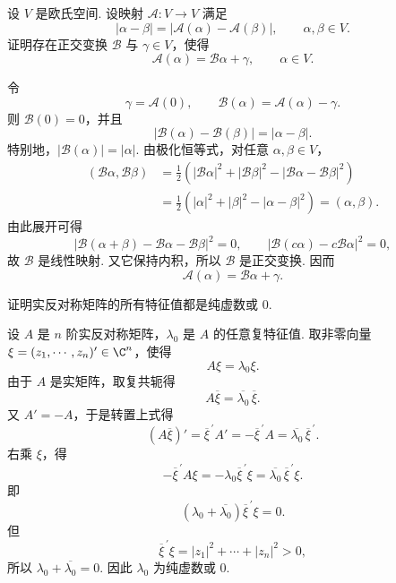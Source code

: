\begin{problem}
	设 $V$ 是欧氏空间. 设映射 $\mathcal A:V\to V$ 满足
	\[
	|\alpha-\beta|=|\mathcal A(\alpha)-\mathcal A(\beta)|,
	\qquad \alpha,\beta\in V.
	\]
	证明存在正交变换 $\mathcal B$ 与 $\gamma\in V$，使得
	\[
	\mathcal A(\alpha)=\mathcal B\alpha+\gamma,
	\qquad \alpha\in V.
	\]
\end{problem}
\begin{solution}
	令
	\[
	\gamma=\mathcal A(0),
	\qquad
	\mathcal B(\alpha)=\mathcal A(\alpha)-\gamma.
	\]
	则 $\mathcal B(0)=0$，并且
	\[
	|\mathcal B(\alpha)-\mathcal B(\beta)|=|\alpha-\beta|.
	\]
	特别地，$|\mathcal B(\alpha)|=|\alpha|$. 由极化恒等式，对任意 $\alpha,\beta\in V$，
	\[
	\begin{aligned}
		(\mathcal B\alpha,\mathcal B\beta)
		&=\frac12\left(|\mathcal B\alpha|^2+|\mathcal B\beta|^2-|\mathcal B\alpha-\mathcal B\beta|^2\right) \\
		&=\frac12\left(|\alpha|^2+|\beta|^2-|\alpha-\beta|^2\right)
		=(\alpha,\beta).
	\end{aligned}
	\]
	由此展开可得
	\[
	|\mathcal B(\alpha+\beta)-\mathcal B\alpha-\mathcal B\beta|^2=0,
	\qquad
	|\mathcal B(c\alpha)-c\mathcal B\alpha|^2=0,
	\]
	故 $\mathcal B$ 是线性映射. 又它保持内积，所以 $\mathcal B$ 是正交变换. 因而
	\[
	\mathcal A(\alpha)=\mathcal B\alpha+\gamma.
	\]
\end{solution}

\begin{problem}
	证明实反对称矩阵的所有特征值都是纯虚数或 $0$.
\end{problem}
\begin{solution}
	设 $A$ 是 $n$ 阶实反对称矩阵，$\lambda_0$ 是 $A$ 的任意复特征值. 取非零向量
	$\xi=(z_1,\cdots,z_n)'\in\C^n$，使得
	\[
	A\xi=\lambda_0\xi.
	\]
	由于 $A$ 是实矩阵，取复共轭得
	\[
	A\overline{\xi}=\overline{\lambda_0}\,\overline{\xi}.
	\]
	又 $A'=-A$，于是转置上式得
	\[
	(A\overline{\xi})'=\overline{\xi}^{\,\prime}A'=-\overline{\xi}^{\,\prime}A
	=\overline{\lambda_0}\,\overline{\xi}^{\,\prime}.
	\]
	右乘 $\xi$，得
	\[
	-\overline{\xi}^{\,\prime}A\xi
	=-\lambda_0\overline{\xi}^{\,\prime}\xi
	=\overline{\lambda_0}\,\overline{\xi}^{\,\prime}\xi.
	\]
	即
	\[
	(\lambda_0+\overline{\lambda_0})\overline{\xi}^{\,\prime}\xi=0.
	\]
	但
	\[
	\overline{\xi}^{\,\prime}\xi=|z_1|^2+\cdots+|z_n|^2>0,
	\]
	所以 $\lambda_0+\overline{\lambda_0}=0$. 因此 $\lambda_0$ 为纯虚数或 $0$.
\end{solution}

